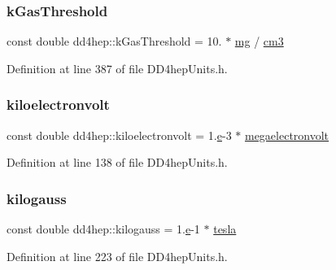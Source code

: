 \subsubsection{\texorpdfstring{k\+Gas\+Threshold}{kGasThreshold}}
{\footnotesize\ttfamily const double dd4hep\+::k\+Gas\+Threshold = 10. $\ast$ \hyperlink{namespacedd4hep_a16e0deb2b676a8d02ab7cf5cf7a8237b}{mg} / \hyperlink{namespacedd4hep_a6464c11bda4aa7d6c4d42f70dbcaf803}{cm3}\hspace{0.3cm}{\ttfamily [static]}}



Definition at line 387 of file D\+D4hep\+Units.\+h.

\hypertarget{namespacedd4hep_a05014d49c7c5438820adf620633249e7}{}\label{namespacedd4hep_a05014d49c7c5438820adf620633249e7} 
\subsubsection{\texorpdfstring{kiloelectronvolt}{kiloelectronvolt}}
{\footnotesize\ttfamily const double dd4hep\+::kiloelectronvolt = 1.\hyperlink{_volumes_8cpp_a8a9a1f93e9b09afccaec215310e64142}{e}-\/3 $\ast$ \hyperlink{namespacedd4hep_a4e39beba039f7a6bda24a7031c121b2a}{megaelectronvolt}\hspace{0.3cm}{\ttfamily [static]}}



Definition at line 138 of file D\+D4hep\+Units.\+h.

\hypertarget{namespacedd4hep_a8fe02d4c7d06e1b8969ab673da2787b3}{}\label{namespacedd4hep_a8fe02d4c7d06e1b8969ab673da2787b3} 
\subsubsection{\texorpdfstring{kilogauss}{kilogauss}}
{\footnotesize\ttfamily const double dd4hep\+::kilogauss = 1.\hyperlink{_volumes_8cpp_a8a9a1f93e9b09afccaec215310e64142}{e}-\/1 $\ast$ \hyperlink{namespacedd4hep_aaddab60c1ddca9986195f0d5cfe03259}{tesla}\hspace{0.3cm}{\ttfamily [static]}}



Definition at line 223 of file D\+D4hep\+Units.\+h.

\hypertarget{namespacedd4hep_a94c5d58440a5bf3d43b1edaa51ae5294}{}\label{namespacedd4hep_a94c5d58440a5bf3d43b1edaa51ae5294} 
